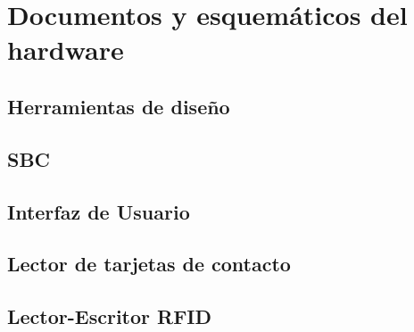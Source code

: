 \chapter{Documentos y esquem\'aticos del hardware}

\section{Herramientas de diseño}
\section{SBC}
\section{Interfaz de Usuario}
\section{Lector de tarjetas de contacto}
\section{Lector-Escritor RFID}


